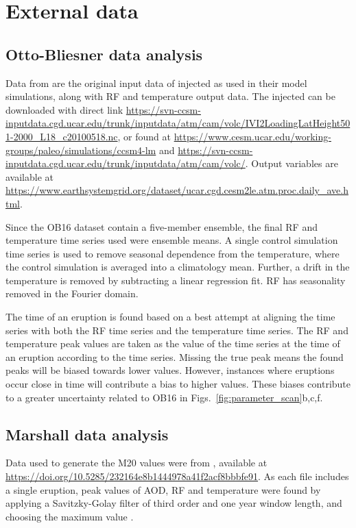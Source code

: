 \documentclass[draft]{agujournal2019}
\newcommand{\iso}[1][i]{{#1}njected \ce{SO2}}
\begin{document}
\section{External data}

\subsection{Otto-Bliesner data analysis}\label{ap:ob16}

Data from  are the original input data of \iso{} as used in
their model simulations, along with RF and temperature output data. The \iso{} can
be downloaded with direct link
\url{https://svn-ccsm-inputdata.cgd.ucar.edu/trunk/inputdata/atm/cam/volc/IVI2LoadingLatHeight501-2000_L18_c20100518.nc},
or found at \url{https://www.cesm.ucar.edu/working-groups/paleo/simulations/ccsm4-lm}
and \url{https://svn-ccsm-inputdata.cgd.ucar.edu/trunk/inputdata/atm/cam/volc/}. Output
variables are available at
\url{https://www.earthsystemgrid.org/dataset/ucar.cgd.cesm2le.atm.proc.daily_ave.html}.

Since the OB16 dataset contain a five-member ensemble, the final RF and
temperature time series used were ensemble means. A single control simulation time
series is used to remove seasonal dependence from the temperature, where the control
simulation is averaged into a climatology mean. Further, a drift in the temperature is
removed by subtracting a linear regression fit. RF has seasonality removed in the
Fourier domain.

The time of an eruption is found based on a best attempt at aligning the  time
series with both the RF time series and the temperature time series. The RF
and temperature peak values are taken as the value of the time series at the time of an
eruption according to the  time series. Missing the true peak means the found
peaks will be biased towards lower values. However, instances where eruptions occur
close in time will contribute a bias to higher values. These biases contribute to a
greater uncertainty related to OB16 in Figs.~\ref{fig:parameter_scan}b,c,f.

\subsection{Marshall data analysis}\label{ap:m20}

Data used to generate the M20 values were from ,
available at \url{https://doi.org/10.5285/232164e8b1444978a41f2acf8bbbfe91}. As each
file includes a single eruption, peak values of AOD, RF and temperature were
found by applying a Savitzky-Golay filter of third order and one year window length, and
choosing the maximum value \cite{savitzky1964}.
\end{document}

